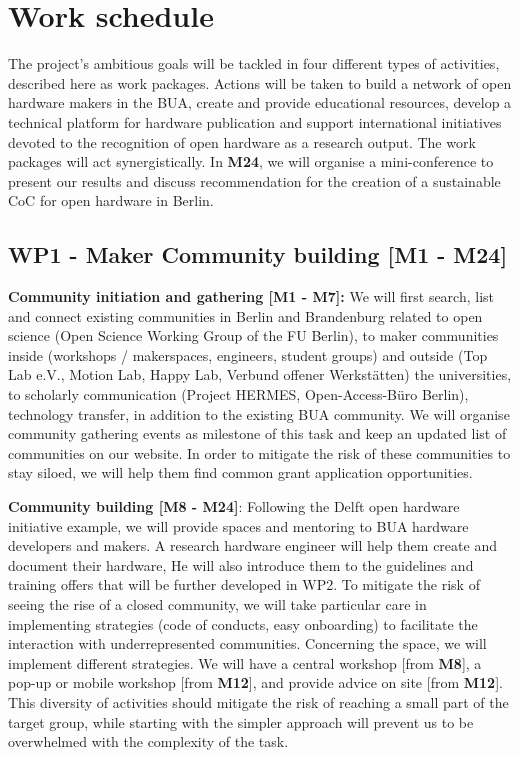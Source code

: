 \documentclass[
  12pt,
  a4paper,
]{article}
\begin{document}
\hypertarget{work-schedule}{%
\section{Work schedule}\label{work-schedule}}

The project's ambitious goals will be tackled in four different types of
activities, described here as work packages. Actions will be taken to
build a network of open hardware makers in the BUA, create and provide
educational resources, develop a technical platform for hardware
publication and support international initiatives devoted to the
recognition of open hardware as a research output. The work packages
will act synergistically. In \textbf{M24}, we will organise a
mini-conference to present our results and discuss recommendation for
the creation of a sustainable CoC for open hardware in Berlin.

\hypertarget{wp1---maker-community-building-m1---m24}{%
\subsection{WP1 - Maker Community building {[}M1 -
M24{]}}\label{wp1---maker-community-building-m1---m24}}

\textbf{Community initiation and gathering {[}M1 - M7{]}:} We will first
search, list and connect existing communities in Berlin and Brandenburg
related to open science (Open Science Working Group of the FU Berlin),
to maker communities inside (workshops / makerspaces, engineers, student
groups) and outside (Top Lab e.V., Motion Lab, Happy Lab, Verbund
offener Werkstätten) the universities, to scholarly communication
(Project HERMES, Open-Access-Büro Berlin), technology transfer, in
addition to the existing BUA community. We will organise community
gathering events as milestone of this task and keep an updated list of
communities on our website. In order to mitigate the risk of these
communities to stay siloed, we will help them find common grant
application opportunities.

\textbf{Community building {[}M8 - M24{]}}: Following the Delft open
hardware initiative example, we will provide spaces and mentoring to BUA
hardware developers and makers. A research hardware engineer will help
them create and document their hardware, He will also introduce them to
the guidelines and training offers that will be further developed in
WP2. To mitigate the risk of seeing the rise of a closed community, we
will take particular care in implementing strategies (code of conducts,
easy onboarding) to facilitate the interaction with underrepresented
communities. Concerning the space, we will implement different
strategies. We will have a central workshop {[}from \textbf{M8}{]}, a
pop-up or mobile workshop {[}from \textbf{M12}{]}, and provide advice on
site {[}from \textbf{M12}{]}. This diversity of activities should
mitigate the risk of reaching a small part of the target group, while
starting with the simpler approach will prevent us to be overwhelmed
with the complexity of the task.
\end{document}
